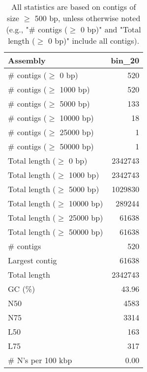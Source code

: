 \documentclass[12pt,a4paper]{article}
\begin{document}
\begin{table}[ht]
\begin{center}
\caption{All statistics are based on contigs of size $\geq$ 500 bp, unless otherwise noted (e.g., "\# contigs ($\geq$ 0 bp)" and "Total length ($\geq$ 0 bp)" include all contigs).}
\begin{tabular}{|l*{1}{|r}|}
\hline
Assembly & bin\_20 \\ \hline
\# contigs ($\geq$ 0 bp) & 520 \\ \hline
\# contigs ($\geq$ 1000 bp) & 520 \\ \hline
\# contigs ($\geq$ 5000 bp) & 133 \\ \hline
\# contigs ($\geq$ 10000 bp) & 18 \\ \hline
\# contigs ($\geq$ 25000 bp) & 1 \\ \hline
\# contigs ($\geq$ 50000 bp) & 1 \\ \hline
Total length ($\geq$ 0 bp) & 2342743 \\ \hline
Total length ($\geq$ 1000 bp) & 2342743 \\ \hline
Total length ($\geq$ 5000 bp) & 1029830 \\ \hline
Total length ($\geq$ 10000 bp) & 289244 \\ \hline
Total length ($\geq$ 25000 bp) & 61638 \\ \hline
Total length ($\geq$ 50000 bp) & 61638 \\ \hline
\# contigs & 520 \\ \hline
Largest contig & 61638 \\ \hline
Total length & 2342743 \\ \hline
GC (\%) & 43.96 \\ \hline
N50 & 4583 \\ \hline
N75 & 3314 \\ \hline
L50 & 163 \\ \hline
L75 & 317 \\ \hline
\# N's per 100 kbp & 0.00 \\ \hline
\end{tabular}
\end{center}
\end{table}
\end{document}
